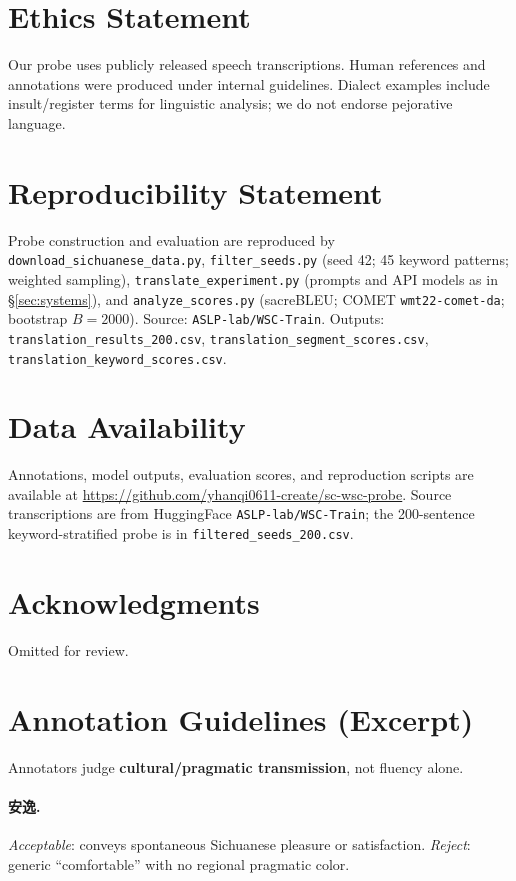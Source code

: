 \documentclass[11pt]{article}
\begin{document}
\section*{Ethics Statement}
Our probe uses publicly released speech transcriptions.
Human references and annotations were produced under internal guidelines.
Dialect examples include insult/register terms for linguistic analysis; we do not endorse pejorative language.

\section*{Reproducibility Statement}
Probe construction and evaluation are reproduced by \texttt{download\_sichuanese\_data.py}, \texttt{filter\_seeds.py} (seed 42; 45 keyword patterns; weighted sampling), \texttt{translate\_experiment.py} (prompts and API models as in \S\ref{sec:systems}), and \texttt{analyze\_scores.py} (sacreBLEU; COMET \texttt{wmt22-comet-da}; bootstrap $B=2000$).
Source: \texttt{ASLP-lab/WSC-Train}.
Outputs: \texttt{translation\_results\_200.csv}, \texttt{translation\_segment\_scores.csv}, \texttt{translation\_keyword\_scores.csv}.

\section*{Data Availability}
Annotations, model outputs, evaluation scores, and reproduction scripts are available at \url{https://github.com/yhanqi0611-create/sc-wsc-probe}.
Source transcriptions are from HuggingFace \texttt{ASLP-lab/WSC-Train}; the 200-sentence keyword-stratified probe is in \texttt{filtered\_seeds\_200.csv}.

\section*{Acknowledgments}
Omitted for review.



\appendix

\section{Annotation Guidelines (Excerpt)}
\label{app:guidelines}

Annotators judge \textbf{cultural/pragmatic transmission}, not fluency alone.

\paragraph{安逸.}
\emph{Acceptable}: conveys spontaneous Sichuanese pleasure or satisfaction.
\emph{Reject}: generic ``comfortable'' with no regional pragmatic color.
\end{document}
